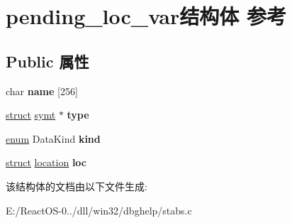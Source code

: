 \hypertarget{structpending__loc__var}{}\section{pending\+\_\+loc\+\_\+var结构体 参考}
\label{structpending__loc__var}
\subsection*{Public 属性}
\begin{DoxyCompactItemize}
\item 
\mbox{\label{structpending__loc__var_a6b603a320b72d660e92477d6298f8f0f}} 
char {\bfseries name} \mbox{[}256\mbox{]}
\item 
\mbox{\label{structpending__loc__var_a2ccafff51f6cb76e14de83ddbddebdd0}} 
\hyperlink{interfacestruct}{struct} \hyperlink{structsymt}{symt} $\ast$ {\bfseries type}
\item 
\mbox{\label{structpending__loc__var_a6b3c2e589c6e15aa33757ecf4951c95e}} 
\hyperlink{interfaceenum}{enum} Data\+Kind {\bfseries kind}
\item 
\mbox{\label{structpending__loc__var_a6424eb04ab00d7c0ca4b9b97398c4de3}} 
\hyperlink{interfacestruct}{struct} \hyperlink{structlocation}{location} {\bfseries loc}
\end{DoxyCompactItemize}


该结构体的文档由以下文件生成\+:\begin{DoxyCompactItemize}
\item 
E\+:/\+React\+O\+S-\/0../dll/win32/dbghelp/stabs.\+c\end{DoxyCompactItemize}
